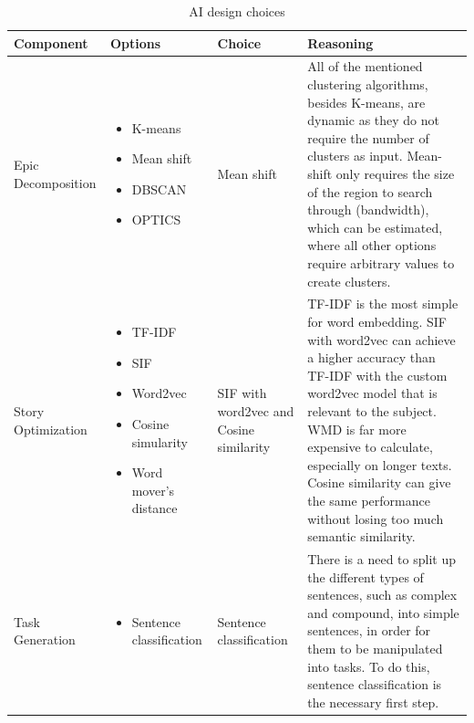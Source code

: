 \begin{table}[!h]
	\caption{AI design choices}
	\label{table:ai}
	\begin{tabularx}{\textwidth}{|p{3cm}|p{3cm}|p{2cm}|X|}
	\hline
	Component & Options & Choice & Reasoning\\
	\hline
	Epic Decomposition & 
		\begin{itemize}
		\item K-means
		\item Mean shift
		\item DBSCAN
		\item OPTICS
		\end{itemize} &
	Mean shift & All of the mentioned clustering algorithms, besides K-means, are dynamic as they do not require the number of clusters as input. Mean-shift only requires the size of the region to search through (bandwidth), which can be estimated, where all other options require arbitrary values to create clusters.\\
	\hline
	Story Optimization & 
		\begin{itemize}
		\item TF-IDF
		\item SIF
		\item Word2vec
		\item Cosine simularity
		\item Word mover's distance
		\end{itemize} &
	\begin{flushleft}
	SIF with word2vec and Cosine similarity
	\end{flushleft} & TF-IDF is the most simple for word embedding. SIF with word2vec can achieve a higher accuracy than TF-IDF with the custom word2vec model that is relevant to the subject. WMD is far more expensive to calculate, especially on longer texts. Cosine similarity can give the same performance without losing too much semantic similarity.\\
	\hline	
	Task Generation & 	
		\begin{itemize}
		\item Sentence classification
		\end{itemize}
	& Sentence classification & There is a need to split up the different types of sentences, such as complex and compound, into simple sentences, in order for them to be manipulated into tasks. To do this, sentence classification is the necessary first step.\\
	\hline	
	\end{tabularx}
\end{table}

